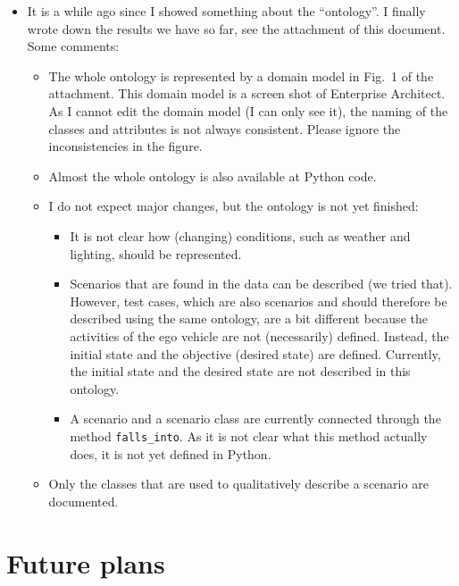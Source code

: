 \documentclass[10pt,final,a4paper,oneside,onecolumn]{article}
\begin{document}
\begin{itemize}
	\item It is a while ago since I showed something about the ``ontology''. I finally wrote down the results we have so far, see the attachment of this document. Some comments: 
	\begin{itemize}
		\item The whole ontology is represented by a domain model in Fig.\ 1 of the attachment. This domain model is a screen shot of Enterprise Architect. As I cannot edit the domain model (I can only see it), the naming of the classes and attributes is not always consistent. Please ignore the inconsistencies in the figure.
		\item Almost the whole ontology is also available at Python code.
		\item I do not expect major changes, but the ontology is not yet finished:
		\begin{itemize}
			\item It is not clear how (changing) conditions, such as weather and lighting, should be represented. 
			\item Scenarios that are found in the data can be described (we tried that). However, test cases, which are also scenarios and should therefore be described using the same ontology, are a bit different because the activities of the ego vehicle are not (necessarily) defined. Instead, the initial state and the objective (desired state) are defined. Currently, the initial state and the desired state are not described in this ontology.
			\item A scenario and a scenario class are currently connected through the method \texttt{falls\_into}. As it is not clear what this method actually does, it is not yet defined in Python.
		\end{itemize}
		\item Only the classes that are used to qualitatively describe a scenario are documented.
	\end{itemize}
	 
\end{itemize}

\section{Future plans}
\end{document}
